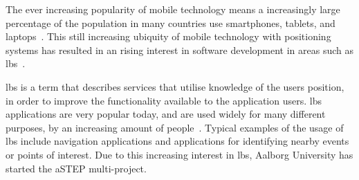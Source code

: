 The ever increasing popularity of mobile technology means a increasingly large percentage of the population in many countries use smartphones, tablets, and laptops~\cite{techcrunch_mobile_usage}. This still increasing ubiquity of mobile technology with positioning systems has resulted in an rising interest in software development in areas such as \gls{lbs}~\cite{dey2010location}. 

\gls{lbs} is a term that describes services that utilise knowledge of the users position, in order to improve the functionality available to the application users. \gls{lbs} applications are very popular today, and are used widely for many different purposes, by an increasing amount of people~\cite[1-2]{schiller2004location}. Typical examples of the usage of \gls{lbs} include navigation applications and applications for identifying nearby events or points of interest. Due to this increasing interest in \gls{lbs}, Aalborg University has started the aSTEP multi-project. 


